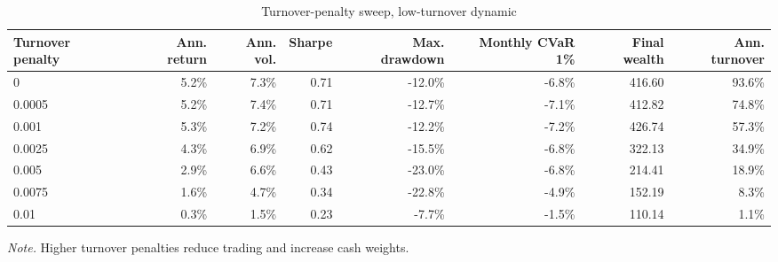 ﻿\begin{table}[H]
\centering
\caption{Turnover-penalty sweep, low-turnover dynamic}
\label{tab:allocation-turnover-penalty-low-turnover}
\small
\begin{adjustbox}{max width=\linewidth}
\begin{tabular}{lrrrrrrr}
\toprule
Turnover penalty & Ann. return & Ann. vol. & Sharpe & Max. drawdown & Monthly CVaR 1\% & Final wealth & Ann. turnover \\
\midrule
0 & 5.2\% & 7.3\% & 0.71 & -12.0\% & -6.8\% & 416.60 & 93.6\% \\
0.0005 & 5.2\% & 7.4\% & 0.71 & -12.7\% & -7.1\% & 412.82 & 74.8\% \\
0.001 & 5.3\% & 7.2\% & 0.74 & -12.2\% & -7.2\% & 426.74 & 57.3\% \\
0.0025 & 4.3\% & 6.9\% & 0.62 & -15.5\% & -6.8\% & 322.13 & 34.9\% \\
0.005 & 2.9\% & 6.6\% & 0.43 & -23.0\% & -6.8\% & 214.41 & 18.9\% \\
0.0075 & 1.6\% & 4.7\% & 0.34 & -22.8\% & -4.9\% & 152.19 & 8.3\% \\
0.01 & 0.3\% & 1.5\% & 0.23 & -7.7\% & -1.5\% & 110.14 & 1.1\% \\
\bottomrule
\end{tabular}
\end{adjustbox}
\vspace{0.25em}
\begin{minipage}{0.92\linewidth}\footnotesize
\emph{Note.} Higher turnover penalties reduce trading and increase cash weights.
\end{minipage}
\end{table}



